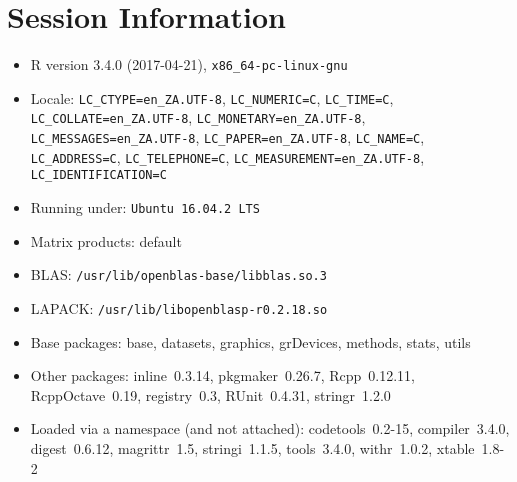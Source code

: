 \documentclass[10pt]{article}\usepackage[]{graphicx}\usepackage[]{color}
\begin{document}
\section*{Session Information}
\begin{itemize}\raggedright
  \item R version 3.4.0 (2017-04-21), \verb|x86_64-pc-linux-gnu|
  \item Locale: \verb|LC_CTYPE=en_ZA.UTF-8|, \verb|LC_NUMERIC=C|, \verb|LC_TIME=C|, \verb|LC_COLLATE=en_ZA.UTF-8|, \verb|LC_MONETARY=en_ZA.UTF-8|, \verb|LC_MESSAGES=en_ZA.UTF-8|, \verb|LC_PAPER=en_ZA.UTF-8|, \verb|LC_NAME=C|, \verb|LC_ADDRESS=C|, \verb|LC_TELEPHONE=C|, \verb|LC_MEASUREMENT=en_ZA.UTF-8|, \verb|LC_IDENTIFICATION=C|
  \item Running under: \verb|Ubuntu 16.04.2 LTS|
  \item Matrix products: default
  \item BLAS: \verb|/usr/lib/openblas-base/libblas.so.3|
  \item LAPACK: \verb|/usr/lib/libopenblasp-r0.2.18.so|
  \item Base packages: base, datasets, graphics, grDevices, methods,
    stats, utils
  \item Other packages: inline~0.3.14, pkgmaker~0.26.7, Rcpp~0.12.11,
    RcppOctave~0.19, registry~0.3, RUnit~0.4.31, stringr~1.2.0
  \item Loaded via a namespace (and not attached): codetools~0.2-15,
    compiler~3.4.0, digest~0.6.12, magrittr~1.5, stringi~1.1.5,
    tools~3.4.0, withr~1.0.2, xtable~1.8-2
\end{itemize}
\end{document}
